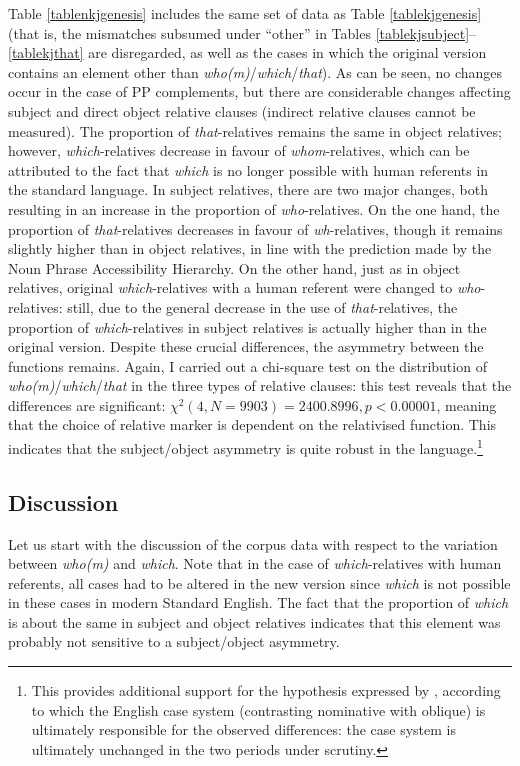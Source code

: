 Table \ref{tablenkjgenesis} includes the same set of data as Table \ref{tablekjgenesis} (that is, the mismatches subsumed under ``other'' in Tables \ref{tablekjsubject}--\ref{tablekjthat} are disregarded, as well as the cases in which the original version contains an element other than \textit{who(m)}/\textit{which}/\textit{that}). As can be seen, no changes occur in the case of PP complements, but there are considerable changes affecting subject and direct object relative clauses (indirect relative clauses cannot be measured). The proportion of \textit{that}-relatives remains the same in object relatives; however, \textit{which}-relatives decrease in favour of \textit{whom}-relatives, which can be attributed to the fact that \textit{which} is no longer possible with human referents in the standard language. In subject relatives, there are two major changes, both resulting in an increase in the proportion of \textit{who}-relatives. On the one hand, the proportion of \textit{that}-relatives decreases in favour of \textit{wh}-relatives, though it remains slightly higher than in object relatives, in line with the prediction made by the Noun Phrase Accessibility Hierarchy. On the other hand, just as in object relatives, original \textit{which}-relatives with a human referent were changed to \textit{who}-relatives: still, due to the general decrease in the use of \textit{that}-relatives, the proportion of \textit{which}-relatives in subject relatives is actually higher than in the original version. Despite these crucial differences, the asymmetry between the functions remains. Again, I carried out a chi-square test on the distribution of \textit{who(m)}/\textit{which}/\textit{that} in the three types of relative clauses: this test reveals that the differences are significant: $\chi^2 (4, N = 9903) = 2400.8996,\allowbreak p < 0.00001$, meaning that the choice of relative marker is dependent on the relativised function. This indicates that the subject/object asymmetry is quite robust in the language.\footnote{This provides additional support for the hypothesis expressed by \citet{bacskaiatkari2020nordlyd}, according to which the English case system (contrasting nominative with oblique) is ultimately responsible for the observed differences: the case system is ultimately unchanged in the two periods under scrutiny.}

\subsection{Discussion} \label{sec:4discussion}\largerpage
Let us start with the discussion of the corpus data with respect to the variation between \textit{who(m)} and \textit{which}. Note that in the case of \textit{which}-relatives with human referents, all cases had to be altered in the new version since \textit{which} is not possible in these cases in modern Standard English. The fact that the proportion of \textit{which} is about the same in subject and object relatives indicates that this element was probably not sensitive to a subject/object asymmetry.

